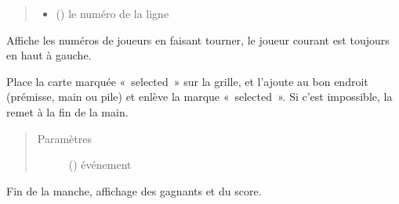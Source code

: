 \documentclass[letterpaper,10pt,french]{sphinxmanual}
\begin{document}
\begin{fulllineitems}
\begin{fulllineitems}
\begin{quote}
\begin{description}
\begin{itemize}
\item {} 
 () \textendash{} le numéro de la ligne

\end{itemize}

\end{description}\end{quote}

\end{fulllineitems}


\begin{fulllineitems}
\label{\detokenize{doc_classe:gui.ErgoGui.display_current_player}}
Affiche les numéros de joueurs en faisant tourner, le joueur
courant est toujours en haut à gauche.

\end{fulllineitems}


\begin{fulllineitems}
\label{\detokenize{doc_classe:gui.ErgoGui.drop}}
Place la carte marquée « selected » sur la grille, et l’ajoute au bon
endroit (prémisse, main ou pile) et enlève la marque « selected ».
Si c’est impossible, la remet à la fin de la main.
\begin{quote}\begin{description}
\item[{Paramètres}] \leavevmode
{} () \textendash{} événement

\end{description}\end{quote}

\end{fulllineitems}


\begin{fulllineitems}
\label{\detokenize{doc_classe:gui.ErgoGui.fin_manche}}
Fin de la manche, affichage des gagnants et du score.

\end{fulllineitems}



\end{fulllineitems}
\end{document}
